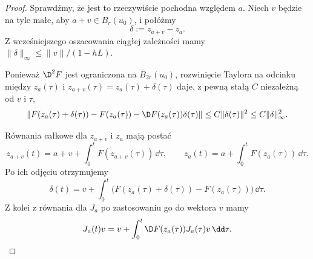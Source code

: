 \begin{proof}
Sprawdźmy, że jest to rzeczywiście pochodna względem $a$.
Niech $v$ będzie na tyle małe, aby $a+v\in B_r(u_0)$, i połóżmy
\[
\delta:=z_{a+v}-z_a.
\]
Z wcześniejszego oszacowania ciągłej zależności mamy
$\|\delta\|_\infty\leq \|v\|/(1-hL)$.

Ponieważ $\D^2F$ jest ograniczona na $\overline B_{2r}(u_0)$,
rozwinięcie Taylora na odcinku między $z_a(\tau)$ i
$z_{a+v}(\tau)=z_a(\tau)+\delta(\tau)$ daje, z pewną stałą
$C$ niezależną od $v$ i $\tau$,
\[
\|F(z_a(\tau)+\delta(\tau))-F(z_a(\tau))
      -\D F(z_a(\tau))\delta(\tau)\|
\leq C\|\delta(\tau)\|^2
\leq C\|\delta\|_\infty^2.
\]

Równania całkowe dla $z_{a+v}$ i $z_a$ mają postać
\[
z_{a+v}(t)=a+v+\int_0^t F(z_{a+v}(\tau))\,\dd\tau,
\qquad
z_a(t)=a+\int_0^t F(z_a(\tau))\,\dd\tau.
\]
Po ich odjęciu otrzymujemy
\[
\delta(t)
=
v+\int_0^t
\bigl(F(z_a(\tau)+\delta(\tau))-F(z_a(\tau))\bigr)\,\dd\tau.
\]
Z kolei z równania dla $J_a$ po zastosowaniu go do wektora $v$ mamy
\[
J_a(t)v
=
v+\int_0^t \D F(z_a(\tau))J_a(\tau)v\,\dd\tau.
\]


\end{proof}
